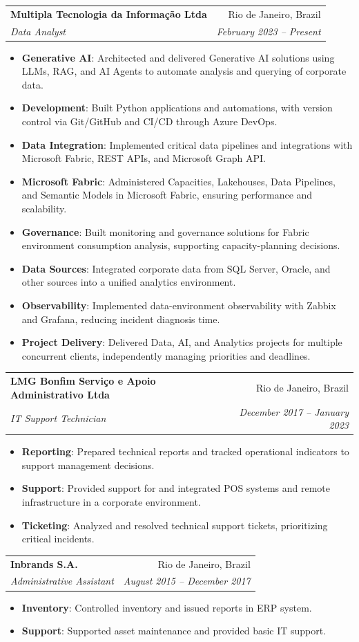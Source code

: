 \documentclass[letterpaper,11pt]{article}
\makeatletter
\newcommand{\resumeItem}[2]{
  \item\small{
    \textbf{#1}{: #2 \vspace{-2pt}}
  }
}
\newcommand{\resumeSubheading}[4]{
  \vspace{-1pt}\item
    \begin{tabular*}{0.97\textwidth}[t]{l@{\extracolsep{\fill}}r}
      \textbf{#1} & #2 \\
      \textit{\small#3} & \textit{\small #4} \\
    \end{tabular*}\vspace{-5pt}
}
\newcommand{\resumeItemListStart}{\begin{itemize}}
\newcommand{\resumeItemListEnd}{\end{itemize}\vspace{-5pt}}
\makeatother
\begin{document}
    \resumeSubheading
      {Multipla Tecnologia da Informação Ltda}{Rio de Janeiro, Brazil}
      {Data Analyst}{February 2023 -- Present}
      \resumeItemListStart
        \resumeItem{Generative AI}
          {Architected and delivered Generative AI solutions using LLMs, RAG, and AI Agents to automate analysis and querying of corporate data.}
        \resumeItem{Development}
          {Built Python applications and automations, with version control via Git/GitHub and CI/CD through Azure DevOps.}
        \resumeItem{Data Integration}
          {Implemented critical data pipelines and integrations with Microsoft Fabric, REST APIs, and Microsoft Graph API.}
        \resumeItem{Microsoft Fabric}
          {Administered Capacities, Lakehouses, Data Pipelines, and Semantic Models in Microsoft Fabric, ensuring performance and scalability.}
        \resumeItem{Governance}
          {Built monitoring and governance solutions for Fabric environment consumption analysis, supporting capacity-planning decisions.}
        \resumeItem{Data Sources}
          {Integrated corporate data from SQL Server, Oracle, and other sources into a unified analytics environment.}
        \resumeItem{Observability}
          {Implemented data-environment observability with Zabbix and Grafana, reducing incident diagnosis time.}
        \resumeItem{Project Delivery}
          {Delivered Data, AI, and Analytics projects for multiple concurrent clients, independently managing priorities and deadlines.}
      \resumeItemListEnd

    \resumeSubheading
      {LMG Bonfim Serviço e Apoio Administrativo Ltda}{Rio de Janeiro, Brazil}
      {IT Support Technician}{December 2017 -- January 2023}
      \resumeItemListStart
        \resumeItem{Reporting}
          {Prepared technical reports and tracked operational indicators to support management decisions.}
        \resumeItem{Support}
          {Provided support for and integrated POS systems and remote infrastructure in a corporate environment.}
        \resumeItem{Ticketing}
          {Analyzed and resolved technical support tickets, prioritizing critical incidents.}
      \resumeItemListEnd

    \resumeSubheading
      {Inbrands S.A.}{Rio de Janeiro, Brazil}
      {Administrative Assistant}{August 2015 -- December 2017}
      \resumeItemListStart
        \resumeItem{Inventory}
          {Controlled inventory and issued reports in ERP system.}
        \resumeItem{Support}
          {Supported asset maintenance and provided basic IT support.}
      \resumeItemListEnd
\end{document}

